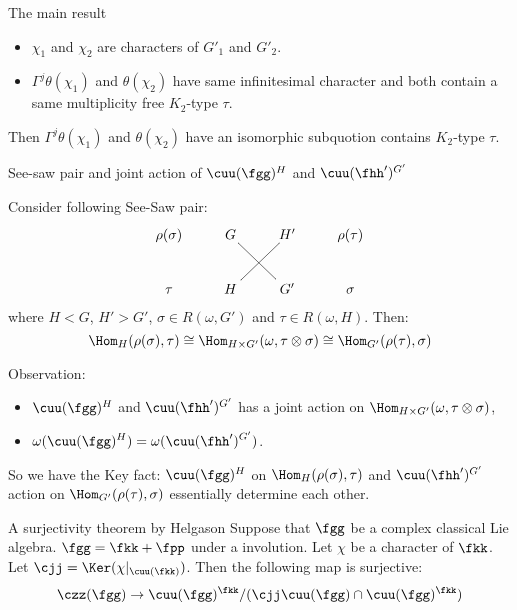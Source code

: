 \documentclass[final,hyperref={pdfpagelabels=false}]{beamer} %
\def\cC{\mathcal{C}}
\begin{document}
\begin{frame}
\begin{columns}
\begin{column}{.49\textwidth}
\begin{block}{The main result}
\begin{itemize}
\begin{itemize}
        \item we can view $(\fgg, K_1)$-module as $(\fgg, K_1\cap K_2)$-module
        \item $\left(\Gamma_{\fgg,K_1\cap K_2}^{\fgg,K_2}\right)^j$ gives a functor 
          from $\cC(\fgg, K_1)$ to $\cC(\fgg,K_2)$.
        \end{itemize}
      \item $\chi_1$ and $\chi_2$ are characters of $G'_1$ and $G'_2$.
      \item $\Gamma^j\theta(\chi_1)$ and  $\theta(\chi_2)$ 
        have same infinitesimal character
        and both contain a same multiplicity free $K_2$-type $\tau$.
      \end{itemize}
      Then 
      $\Gamma^j\theta(\chi_1)$ and $\theta(\chi_2)$ 
      have an isomorphic subquotion contains  $K_2$-type $\tau$.
    \end{block}
    
    \begin{block}{See-saw pair and  joint action of $\cuu(\fgg)^H$ 
and $\cuu(\fhh')^{G'}$}

Consider following See-Saw pair:
\[
\xymatrix{
\rho(\sigma)& G \ar@{-}[dr] & H'& \rho(\tau)\\
\tau &H\ar@{-}[ur] & G' & \sigma
}
\]
where $H < G$, $H'> G'$, $\sigma\in R(\omega, G')$ and  $\tau\in R(\omega,H)$.
Then:
\[
\Hom_{H}(\rho(\sigma), \tau) 
\cong  \Hom_{H\times G'}(\omega, \tau\otimes \sigma)
\cong  \Hom_{G'}(\rho(\tau), \sigma)
\]

Observation:
\begin{itemize}
\item $\cuu(\fgg)^H$ and $\cuu(\fhh')^{G'}$ 
  has a joint action on $\Hom_{H\times G'}(\omega,\tau\otimes\sigma)$,
\item $\displaystyle \omega(\cuu(\fgg)^H) = \omega(\cuu(\fhh')^{G'})$.
\end{itemize}

So we have the Key fact: $\cuu(\fgg)^H$ on $\Hom_H(\rho(\sigma),\tau)$ and $\cuu(\fhh')^{G'}$  action on $\Hom_{G'}(\rho(\tau),\sigma)$ essentially determine each other.
\end{block}

\begin{block}{A surjectivity theorem by Helgason}
  Suppose that $\fgg$ be a complex classical Lie algebra.  
  $\fgg = \fkk+\fpp$ under a involution. 
  Let $\chi$ be a character of $\fkk$.
  Let $\cjj = \Ker(\chi|_{\cuu(\fkk)})$.
  Then the following map is surjective:
  \[
  \czz(\fgg) \to \cuu(\fgg)^\fkk/(\cjj\cuu(\fgg)\cap\cuu(\fgg)^\fkk)
  \]
\end{block}


\end{column}
\end{columns}
\end{frame}
\end{document}
